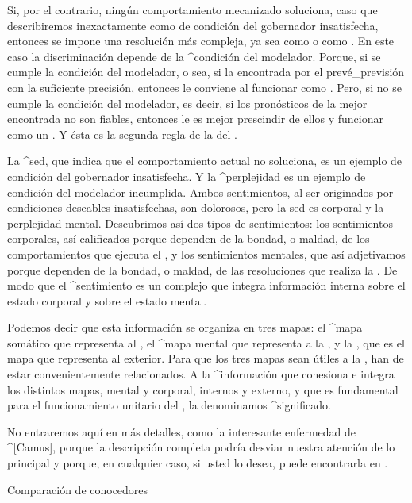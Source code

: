 Si, por el contrario, ningún comportamiento mecanizado soluciona, caso
que describiremos inexactamente como de condición del gobernador
insatisfecha, entonces se impone una resolución más compleja, ya sea
como {\adaptador} o como {\aprendiz}. En este caso la discriminación
depende de la ^{condición del modelador}. Porque, si se cumple la
condición del modelador, o sea, si la {\realidad} encontrada por el
{\modelador} prevé_{previsión} con la suficiente precisión, entonces le
conviene al {\conocedor} funcionar como {\aprendiz}. Pero, si no se
cumple la condición del modelador, es decir, si los pronósticos de la
mejor {\realidad} encontrada no son fiables, entonces le es mejor
prescindir de ellos y funcionar como un {\adaptador}. Y ésta es la
segunda regla de la {\inteligencia} del {\conocedor}.

La ^{sed}, que indica que el comportamiento actual no soluciona, es un
ejemplo de condición del gobernador insatisfecha. Y la ^{perplejidad} es
un ejemplo de condición del modelador incumplida. Ambos sentimientos, al
ser originados por condiciones deseables insatisfechas, son dolorosos,
pero la sed es corporal y la perplejidad mental. Descubrimos así dos
tipos de sentimientos: los sentimientos corporales, así calificados
porque dependen de la bondad, o maldad, de los comportamientos que
ejecuta el {\cuerpo}, y los sentimientos mentales, que así adjetivamos
porque dependen de la bondad, o maldad, de las resoluciones que realiza
la {\mente}. De modo que el ^{sentimiento} es un complejo que integra
información interna sobre el estado corporal y sobre el estado mental.

Podemos decir que esta información se organiza en tres mapas: el ^{mapa
somático} que representa al {\cuerpo}, el ^{mapa mental} que representa
a la {\mente}, y la {\realidad}, que es el mapa que representa al
exterior. Para que los tres mapas sean útiles a la {\inteligencia}, han
de estar convenientemente relacionados. A la ^{información} que
cohesiona e integra los distintos mapas, mental y corporal, internos y
externo, y que es fundamental para el funcionamiento unitario del
{\conocedor}, la denominamos ^{significado}.

No entraremos aquí en más detalles, como la interesante enfermedad de
^[Camus], porque la descripción completa podría desviar nuestra atención
de lo principal y porque, en cualquier caso, si usted lo desea, puede
encontrarla en .


\Section Comparación de conocedores

